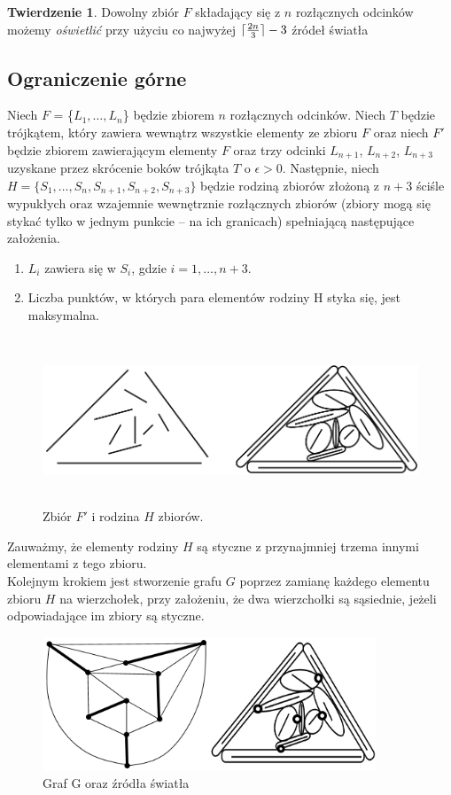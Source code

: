 \documentclass[brudnopis]{xmgr}
\DeclarePairedDelimiter\ceil{\lceil}{\rceil}
\theoremstyle{definition}
\newtheorem{Twierdzenie}{Twierdzenie}
\begin{document}
\begin{Twierdzenie} \cite{illumination}
 Dowolny zbiór $F$ składający się z $n$ rozłącznych odcinków możemy \emph{oświetlić} przy użyciu co najwyżej $\ceil{\frac{2n}{3}} - 3$ źródeł światła
\end{Twierdzenie}

\subsection{Ograniczenie górne}
\indent Niech $F$ = \{$L_1, \ldots, L_n$\} będzie zbiorem $n$ rozłącznych odcinków. Niech $T$ będzie trójkątem, który zawiera wewnątrz wszystkie elementy ze zbioru $F$ oraz niech $F'$ będzie zbiorem zawierającym elementy $F$ oraz trzy odcinki $L_{n+1}$, $L_{n+2}$, $L_{n+3}$ uzyskane przez skrócenie boków trójkąta $T$ o $\epsilon > 0$.
Następnie, niech $H = \{S_1,\ldots,S_n,S_{n+1},S_{n+2},S_{n+3}\}$ będzie rodziną zbiorów złożoną z $n + 3$ ściśle wypukłych oraz wzajemnie wewnętrznie rozłącznych zbiorów (zbiory mogą się stykać tylko w jednym punkcie -- na ich granicach) spełniającą następujące założenia.
\begin{enumerate}
  \item $L_i$ zawiera się w $S_i$, gdzie $i = 1,\ldots,n+3$.
  \item Liczba punktów, w których para elementów rodziny H styka się, jest maksymalna.
\end{enumerate}
\begin{figure}[ht!]
 \centering
  \includegraphics[height=5cm, width=13.5cm]{rysunki/podswietlenie.png}
  \caption{Zbiór $F'$ i rodzina $H$ zbiorów.}
\end{figure} 
Zauważmy, że elementy rodziny $H$ są styczne z przynajmniej trzema innymi elementami z tego zbioru. 
\\\indent Kolejnym krokiem jest stworzenie grafu $G$ poprzez zamianę każdego elementu zbioru $H$ na wierzchołek, przy założeniu, że dwa wierzchołki są sąsiednie, jeżeli odpowiadające im zbiory są styczne.
\begin{figure}[ht!]
 \centering
  \includegraphics[height=4cm]{rysunki/skojarzenia_zrodla_swiatla.png}
  \caption{Graf G oraz źródła światła}
\end{figure}
\end{document}
